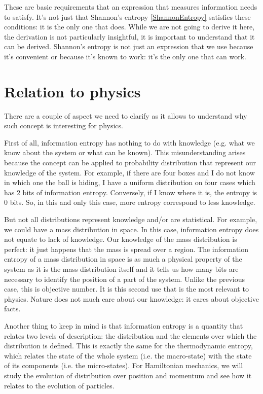 \documentclass[aps,pra,10pt,floatfix,nofootinbib]{revtex4-1}
\theoremstyle{definition}
\begin{document}
These are basic requirements that an expression that measures information needs to satisfy. It's not just that Shannon's entropy \eqref{ShannonEntropy} satisfies these conditions: it is the only one that does. While we are not going to derive it here, the derivation is not particularly insightful, it is important to understand that it can be derived. Shannon's entropy is not just an expression that we use because it's convenient or because it's known to work: it's the only one that can work.

\section{Relation to physics}

There are a couple of aspect we need to clarify as it allows to understand why such concept is interesting for physics.

First of all, information entropy has nothing to do with knowledge (e.g. what we know about the system or what can be known). This misunderstanding arises because the concept can be applied to probability distribution that represent our knowledge of the system. For example, if there are four boxes and I do not know in which one the ball is hiding, I have a uniform distribution on four cases which has 2 bits of information entropy. Conversely, if I know where it is, the entropy is 0 bits. So, in this and only this case, more entropy correspond to less knowledge.

But not all distributions represent knowledge and/or are statistical. For example, we could have a mass distribution in space. In this case, information entropy does not equate to lack of knowledge. Our knowledge of the mass distribution is perfect: it just happens that the mass is spread over a region. The information entropy of a mass distribution in space is as much a physical property of the system as it is the mass distribution itself and it tells us how many bits are necessary to identify the position of a part of the system. Unlike the previous case, this is objective number. It is this second use that is the most relevant to physics. Nature does not much care about our knowledge: it cares about objective facts.

Another thing to keep in mind is that information entropy is a quantity that relates two levels of description: the distribution and the elements over which the distribution is defined. This is exactly the same for the thermodynamic entropy, which relates the state of the whole system (i.e. the macro-state) with the state of its components (i.e. the micro-states). For Hamiltonian mechanics, we will study the evolution of distribution over position and momentum and see how it relates to the evolution of particles.
\end{document}
